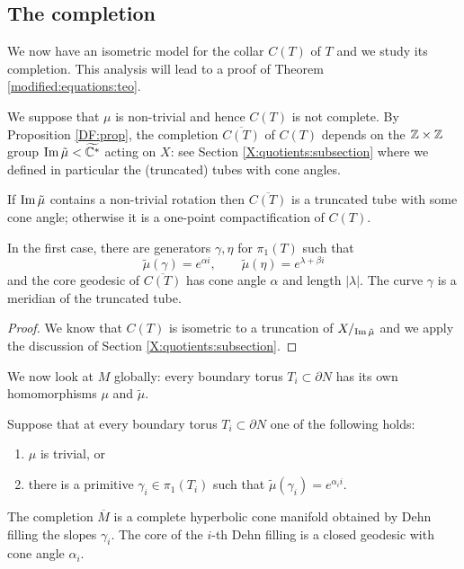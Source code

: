 \subsection{The completion}
We now have an isometric model for the collar $C(T)$ of $T$ and we study its completion. This analysis will lead to a proof of Theorem \ref{modified:equations:teo}.

We suppose that $\mu$ is non-trivial and hence $C(T)$ is not complete. By Proposition \ref{DF:prop}, the completion $\overline{C(T)}$ of $C(T)$ depends on the $\mathbb{Z}\times \mathbb{Z}$ group ${\rm Im\,} \tilde \mu< \widetilde{\mathbb{C}^*}$ acting on $X$: see Section \ref{X:quotients:subsection} where we defined in particular the (truncated) tubes with cone angles. 

\begin{prop} \label{DF1:prop}
If ${\rm Im\,} \tilde \mu$ contains a non-trivial rotation then $\overline{C(T)}$ is a truncated tube with some cone angle; otherwise it is a one-point compactification of $C(T)$. 

In the first case, there are generators $\gamma, \eta$ for $\pi_1(T)$ such that 
$$\tilde \mu(\gamma) = e^{\alpha i}, \qquad \tilde \mu(\eta) = e^{\lambda + \beta i}$$
and the core geodesic of $\overline {C(T)}$ has cone angle $\alpha$ and length $|\lambda|$. The curve $\gamma$ is a meridian of the truncated tube.
\end{prop}
\begin{proof}
We know that $C(T)$ is isometric to a truncation of $X/_{{\rm Im\,} \tilde \mu}$ and we apply the discussion of Section \ref{X:quotients:subsection}.
\end{proof}

We now look at $M$ globally: every boundary torus $T_i\subset \partial N$ has its own homomorphisms $\mu$ and $\tilde \mu$.

\begin{cor} \label{DF2:cor}
Suppose that at every boundary torus $T_i\subset \partial N$ one of the following holds:
\begin{enumerate}
\item $\mu$ is trivial, or
\item there is a primitive $\gamma_i\in \pi_1(T_i)$ such that $\tilde\mu(\gamma_i) = e^{\alpha_i i}$.
\end{enumerate}
The completion $\overline M$ is a complete hyperbolic cone manifold obtained by Dehn filling the slopes $\gamma_i$. The core of the $i$-th Dehn filling is a closed geodesic with cone angle $\alpha_i$.
\end{cor}

